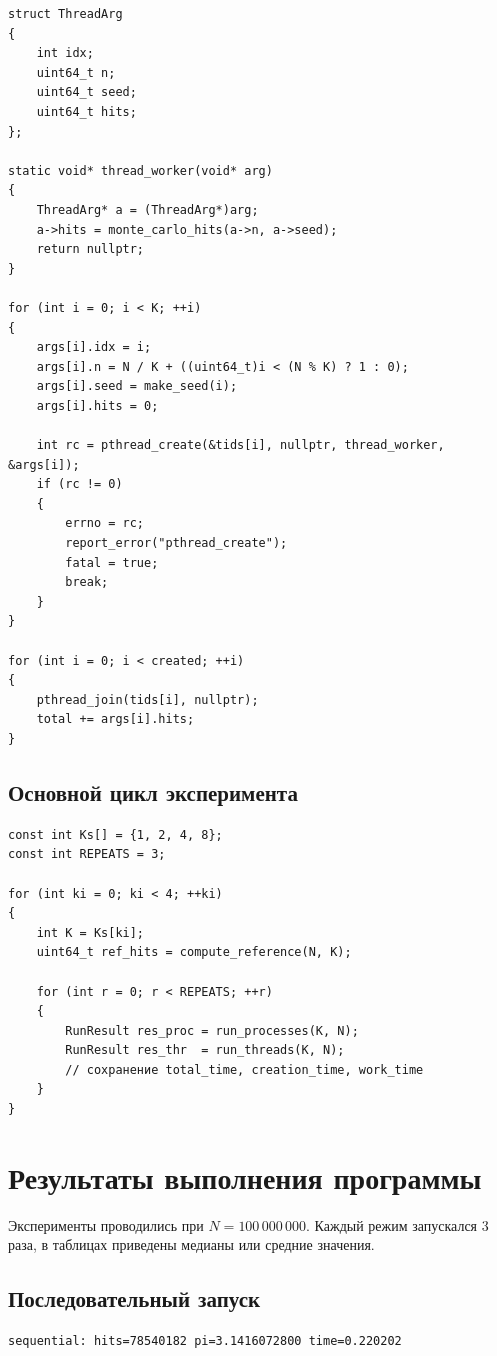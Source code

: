 \begin{lstlisting}
struct ThreadArg
{
    int idx;
    uint64_t n;
    uint64_t seed;
    uint64_t hits;
};

static void* thread_worker(void* arg)
{
    ThreadArg* a = (ThreadArg*)arg;
    a->hits = monte_carlo_hits(a->n, a->seed);
    return nullptr;
}

for (int i = 0; i < K; ++i)
{
    args[i].idx = i;
    args[i].n = N / K + ((uint64_t)i < (N % K) ? 1 : 0);
    args[i].seed = make_seed(i);
    args[i].hits = 0;

    int rc = pthread_create(&tids[i], nullptr, thread_worker, &args[i]);
    if (rc != 0)
    {
        errno = rc;
        report_error("pthread_create");
        fatal = true;
        break;
    }
}

for (int i = 0; i < created; ++i)
{
    pthread_join(tids[i], nullptr);
    total += args[i].hits;
}
\end{lstlisting}

\subsection*{Основной цикл эксперимента}

\begin{lstlisting}
const int Ks[] = {1, 2, 4, 8};
const int REPEATS = 3;

for (int ki = 0; ki < 4; ++ki)
{
    int K = Ks[ki];
    uint64_t ref_hits = compute_reference(N, K);

    for (int r = 0; r < REPEATS; ++r)
    {
        RunResult res_proc = run_processes(K, N);
        RunResult res_thr  = run_threads(K, N);
        // сохранение total_time, creation_time, work_time
    }
}
\end{lstlisting}

\newpage
\section{Результаты выполнения программы}

Эксперименты проводились при \(N = 100\,000\,000\). Каждый режим запускался
3 раза, в таблицах приведены медианы или средние значения.

\subsection*{Последовательный запуск}

\begin{verbatim}
sequential: hits=78540182 pi=3.1416072800 time=0.220202
\end{verbatim}


